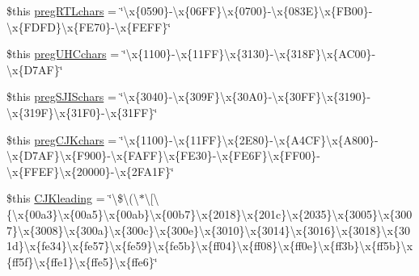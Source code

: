 \begin{DoxyCompactItemize}
\item 
\$this \hyperlink{config_8php_a9204e6850b1f29e872274d4676417dfb}{preg\-R\-T\-Lchars} = \char`\"{}\textbackslash{}x\{0590\}-\/\textbackslash{}x\{06\-F\-F\}\textbackslash{}x\{0700\}-\/\textbackslash{}x\{083\-E\}\textbackslash{}x\{\-F\-B00\}-\/\textbackslash{}x\{\-F\-D\-F\-D\}\textbackslash{}x\{\-F\-E70\}-\/\textbackslash{}x\{\-F\-E\-F\-F\}\char`\"{}
\item 
\$this \hyperlink{config_8php_a46d874f5173309d8e5cbaa06fd229f52}{preg\-U\-H\-Cchars} = \char`\"{}\textbackslash{}x\{1100\}-\/\textbackslash{}x\{11\-F\-F\}\textbackslash{}x\{3130\}-\/\textbackslash{}x\{318\-F\}\textbackslash{}x\{\-A\-C00\}-\/\textbackslash{}x\{\-D7\-A\-F\}\char`\"{}
\item 
\$this \hyperlink{config_8php_aed738d51f0dc79e2b58567ab98d6e594}{preg\-S\-J\-I\-Schars} = \char`\"{}\textbackslash{}x\{3040\}-\/\textbackslash{}x\{309\-F\}\textbackslash{}x\{30\-A0\}-\/\textbackslash{}x\{30\-F\-F\}\textbackslash{}x\{3190\}-\/\textbackslash{}x\{319\-F\}\textbackslash{}x\{31\-F0\}-\/\textbackslash{}x\{31\-F\-F\}\char`\"{}
\item 
\$this \hyperlink{config_8php_ae8b3e9366007d6d3fb765a74188a8a9f}{preg\-C\-J\-Kchars} = \char`\"{}\textbackslash{}x\{1100\}-\/\textbackslash{}x\{11\-F\-F\}\textbackslash{}x\{2\-E80\}-\/\textbackslash{}x\{\-A4\-C\-F\}\textbackslash{}x\{\-A800\}-\/\textbackslash{}x\{\-D7\-A\-F\}\textbackslash{}x\{\-F900\}-\/\textbackslash{}x\{\-F\-A\-F\-F\}\textbackslash{}x\{\-F\-E30\}-\/\textbackslash{}x\{\-F\-E6\-F\}\textbackslash{}x\{\-F\-F00\}-\/\textbackslash{}x\{\-F\-F\-E\-F\}\textbackslash{}x\{20000\}-\/\textbackslash{}x\{2\-F\-A1\-F\}\char`\"{}
\item 
\$this \hyperlink{config_8php_a728940c3e918c339351ad1cb52be0a14}{C\-J\-Kleading} = \char`\"{}\textbackslash{}\$\textbackslash{}(\textbackslash{}$\ast$\textbackslash{}\mbox{[}\textbackslash{}\{\textbackslash{}x\{00a3\}\textbackslash{}x\{00a5\}\textbackslash{}x\{00ab\}\textbackslash{}x\{00b7\}\textbackslash{}x\{2018\}\textbackslash{}x\{201c\}\textbackslash{}x\{2035\}\textbackslash{}x\{3005\}\textbackslash{}x\{3007\}\textbackslash{}x\{3008\}\textbackslash{}x\{300a\}\textbackslash{}x\{300c\}\textbackslash{}x\{300e\}\textbackslash{}x\{3010\}\textbackslash{}x\{3014\}\textbackslash{}x\{3016\}\textbackslash{}x\{3018\}\textbackslash{}x\{301d\}\textbackslash{}x\{fe34\}\textbackslash{}x\{fe57\}\textbackslash{}x\{fe59\}\textbackslash{}x\{fe5b\}\textbackslash{}x\{ff04\}\textbackslash{}x\{ff08\}\textbackslash{}x\{ff0e\}\textbackslash{}x\{ff3b\}\textbackslash{}x\{ff5b\}\textbackslash{}x\{ff5f\}\textbackslash{}x\{ffe1\}\textbackslash{}x\{ffe5\}\textbackslash{}x\{ffe6\}\char`\"{}

\end{DoxyCompactItemize}
